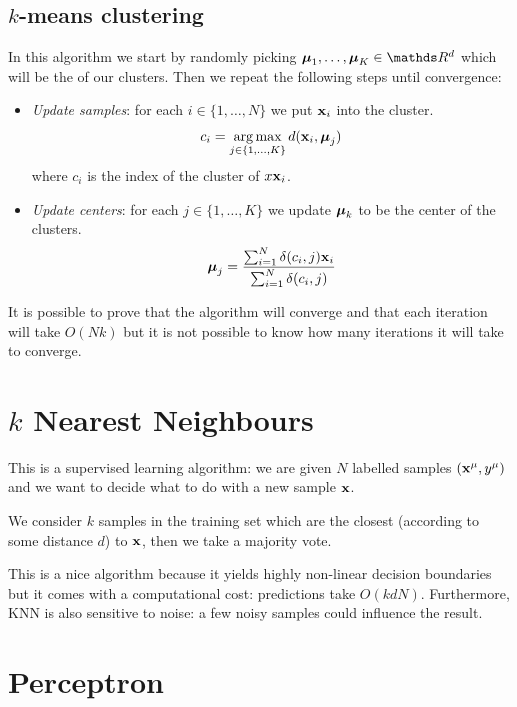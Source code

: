 \documentclass[12pt]{extarticle}
\renewcommand{\vec}[1]{\bvec{#1}}
\begin{document}
\subsection{\texorpdfstring{$k$}{k}-means clustering}

In this algorithm we start by randomly picking $\vec \mu_1, \dots, \vec \mu_K \in \R^d$ which will be the
 of our clusters.
Then we repeat the following steps until convergence:
\begin{itemize}
	\item \emph{Update samples}: for each $i \in \{1, \dots, N\}$ we put $\vec x_i$ into the
	       cluster.
	      \begin{equation}
		      c_i = \argmax_{j \in \{1, \dots, K\}} d(\vec x_i, \vec \mu_j)
	      \end{equation}
	      where $c_i$ is the index of the cluster of $x\vec x_i$.

	\item \emph{Update centers}: for each $j \in \{1, \dots, K\}$ we update $\vec \mu_k$ to be the
	      center of the clusters.
	      \begin{equation}
		      \vec \mu_j = \frac{\sum_{i = 1}^N \delta(c_i, j) \vec x_i}{\sum_{i = 1}^N \delta(c_i, j)}
	      \end{equation}
\end{itemize}

It is possible to prove that the algorithm will converge and that each iteration will take $O(Nk)$
but it is not possible to know how many iterations it will take to converge.

\section{\texorpdfstring{$k$}{k} Nearest Neighbours}

This is a supervised learning algorithm: we are given $N$ labelled samples $(\vec x^\mu, y^\mu)$ and
we want to decide what to do with a new sample $\vec x$.

We consider $k$ samples in the training set which are the closest (according to some distance $d$)
to $\vec x$, then we take a majority vote.

This is a nice algorithm because it yields highly non-linear decision boundaries but it comes with a
computational cost: predictions take $O(kdN)$.
Furthermore, KNN is also sensitive to noise: a few noisy samples could influence the result.

\section{Perceptron}
\end{document}
